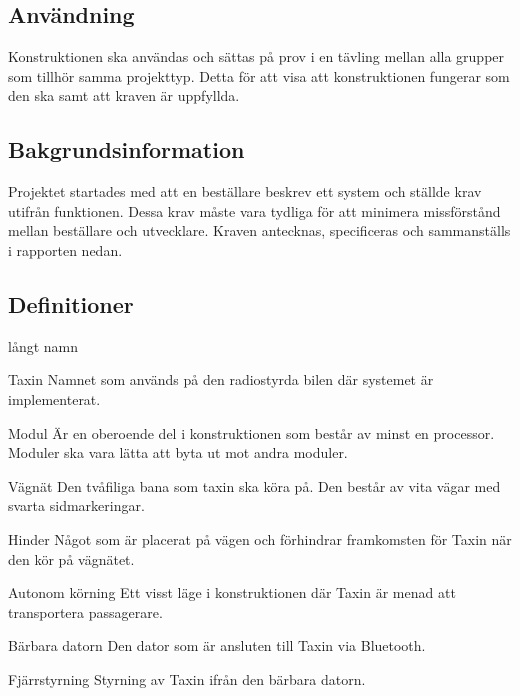 \documentclass[kravspec/krav.tex]{subfiles}
\begin{document}
\subsection{Användning}
Konstruktionen ska användas och sättas på prov i en tävling mellan alla grupper
som tillhör samma projekttyp. Detta för att visa att konstruktionen fungerar
som den ska samt att kraven är uppfyllda.

\subsection{Bakgrundsinformation}
Projektet startades med att en beställare beskrev ett system och ställde krav
utifrån funktionen. Dessa krav måste vara tydliga för att minimera missförstånd
mellan beställare och utvecklare. Kraven antecknas, specificeras och
sammanställs i rapporten nedan.

\subsection{Definitioner}
\begin{labeling}{långt namn}
    \item[Taxin] Namnet som används på den radiostyrda bilen där systemet är
    implementerat.
    \item[Modul] Är en oberoende del i konstruktionen som består av minst en
    processor. Moduler ska vara lätta att byta ut mot andra moduler.
    \item[Vägnät] Den tvåfiliga bana som taxin ska köra på. Den består av vita
    vägar med svarta sidmarkeringar.
    \item[Hinder] Något som är placerat på vägen och förhindrar framkomsten för
    Taxin när den kör på vägnätet.
    \item[Autonom körning] Ett visst läge i konstruktionen där Taxin är menad
    att transportera passagerare.
    \item[Bärbara datorn] Den dator som är ansluten till Taxin via Bluetooth.
    \item[Fjärrstyrning] Styrning av Taxin ifrån den bärbara datorn. 
\end{labeling}
\end{document}
